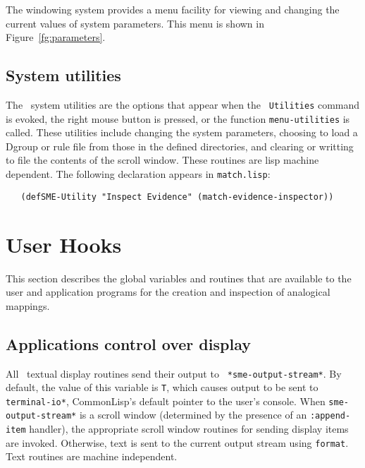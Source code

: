 
The windowing system provides a menu facility for viewing and changing the
current values of system parameters. This menu is shown in
Figure~\ref{fg:parameters}.


\subsection{System utilities}

\indent
{}

The \SME\ system utilities are the options that appear when the {\tt
Utilities} command is evoked, the right mouse button is pressed, or the
function {\tt menu-utilities} is called. These utilities include changing
the system parameters, choosing to load a Dgroup or rule file from those in
the defined directories, and clearing or writting to file the contents of
the scroll window. These routines are lisp machine dependent. The following
declaration appears in {\tt match.lisp}:
\begin{small}
\begin{verbatim}
   (defSME-Utility "Inspect Evidence" (match-evidence-inspector))
\end{verbatim}
\end{small}


\section{User Hooks}

This section describes the global variables and routines that are available
to the user and application programs for the creation and inspection of
analogical mappings.

\subsection{Applications control over display}

\indent
{}

All \SME\ textual display routines send their output to {\tt
*sme-output-stream*}. By default, the value of this variable is {\tt T},
which causes output to be sent to {\tt *terminal-io*}, CommonLisp's default
pointer to the user's console. When {\tt *sme-output-stream*} is a scroll
window (determined by the presence of an {\tt :append-item} handler), the
appropriate scroll window routines for sending display items are invoked.
Otherwise, text is sent to the current output stream using {\tt format}. 
Text routines are machine independent.

